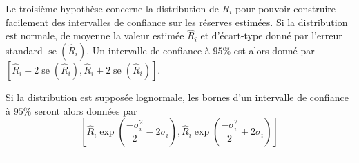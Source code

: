 \begin{f}
%

		

Le troisième hypothèse concerne la distribution de $R_{i}$ pour pouvoir construire facilement des intervalles de confiance sur les réserves estimées. Si  la distribution est normale, de moyenne la valeur estimée $\hat{R}_{i}$ et d'écart-type donné par l'erreur standard $\operatorname{se}\left(\hat{R}_{i}\right)$. Un intervalle de confiance à $95 \%$ est alors donné par $\left[\hat{R}_{i}-2 \operatorname{se}\left(\hat{R}_{i}\right), \hat{R}_{i}+2 \operatorname{se}\left(\hat{R}_{i}\right)\right]$.

Si la distribution est supposée lognormale, les bornes d'un intervalle de confiance à $95 \%$ seront alors données par
$$
\left[\hat{R}_{i} \exp \left(\frac{-\sigma_{i}^{2}}{2}-2 \sigma_{i}\right), \hat{R}_{i} \exp \left(\frac{-\sigma_{i}^{2}}{2}+2 \sigma_{i}\right)\right]
$$
		
\end{f}
\hrule

